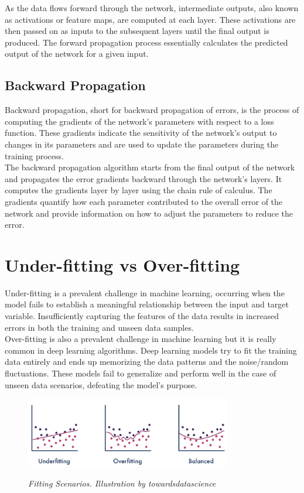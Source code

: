 As the data flows forward through the network, intermediate outputs, also known
as activations or feature maps, are computed at each layer. These activations
are then passed on as inputs to the subsequent layers until the final output is
produced. The forward propagation process essentially calculates the predicted
output of the network for a given input.

\subsection{Backward Propagation}

Backward propagation, short for backward propagation of errors, is the process
of computing the gradients of the network's parameters with respect to a loss
function. These gradients indicate the sensitivity of the network's output to
changes in its parameters and are used to update the parameters during the
training process. \\

The backward propagation algorithm starts from the final output of the network
and propagates the error gradients backward through the network's layers. It
computes the gradients layer by layer using the chain rule of calculus. The
gradients quantify how each parameter contributed to the overall error of the
network and provide information on how to adjust the parameters to reduce the
error.


\section{Under-fitting vs Over-fitting}

Under-fitting is a prevalent challenge in machine learning, occurring when the
model fails to establish a meaningful relationship between the input and target
variable. Insufficiently capturing the features of the data results in
increased errors in both the training and unseen data samples. \\

Over-fitting is also a prevalent challenge in machine learning but it is really
common in deep learning algorithms. Deep learning models try to fit the
training data entirely and ends up memorizing the data patterns and the
noise/random fluctuations. These models fail to generalize and perform well in
the case of unseen data scenarios, defeating the model's purpose. \\

\begin{figure}[H]
  \centering
  \includegraphics[width=0.8\textwidth]{imatges/preliminaries/over-under-base.jpg}
  \caption[Fitting Scenarios]{\textit{Fitting Scenarios. Illustration by towardsdatascience}}
  {\label{fig:underfitting-overfitting-goodfitting}}
\end{figure}

